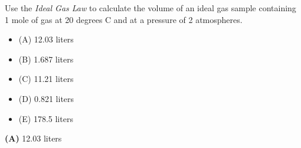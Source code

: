 

Use the {\it Ideal Gas Law} to calculate the volume of an ideal gas sample containing 1 mole of gas at 20 degrees C and at a pressure of 2 atmospheres. 

\begin{itemize}
\item{(A)} 12.03 liters
\vskip 5pt 
\item{(B)} 1.687 liters
\vskip 5pt 
\item{(C)} 11.21 liters
\vskip 5pt 
\item{(D)} 0.821 liters
\vskip 5pt 
\item{(E)} 178.5 liters
\end{itemize}







{\bf (A)} 12.03 liters
 










